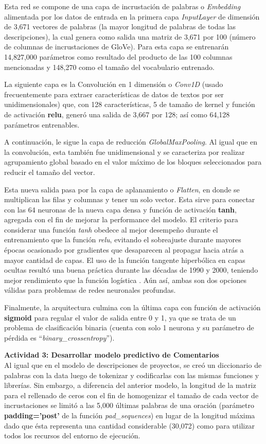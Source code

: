 Esta red se compone de una capa de incrustación de palabras o \textit{Embedding} alimentada por los datos de entrada en la primera capa \textit{InputLayer} de dimensión de 3,671 vectores de palabras (la mayor longitud de palabras de todas las descripciones), la cual genera como salida una matriz de 3,671 por 100 (número de columnas de incrustaciones de GloVe). Para esta capa se entrenarán 14,827,000 parámetros como resultado del producto de las 100 columnas mencionadas y 148,270 como el tamaño del vocabulario entrenado.

La siguiente capa es la Convolución en 1 dimensión o \textit{Conv1D} (usado frecuentemente para extraer características de datos de textos por ser unidimensionales) que, con 128 características, 5 de tamaño de kernel y función de activación \textbf{relu}, generó una salida de 3,667 por 128; así como 64,128 parámetros entrenables.

A continuación, le sigue la capa de reducción \textit{GlobalMaxPooling}. Al igual que en la convolución, esta también fue unidimensional y se caracteriza por realizar agrupamiento global basado en el valor máximo de los bloques seleccionados para reducir el tamaño del vector.

Esta nueva salida pasa por la capa de aplanamiento o \textit{Flatten}, en donde se multiplican las filas y columnas y tener un solo vector. Esta sirve para conectar con las 64 neuronas de la nueva capa densa y función de activación \textbf{tanh}, agregada con el fin de mejorar la performance del modelo. El criterio para considerar una función \textit{tanh} obedece al mejor desempeño durante el entrenamiento que la función \textit{relu}, evitando el sobreajuste durante mayores épocas ocasionado por gradientes que desaparecen al propagar hacia atrás a mayor cantidad de capas. El uso de la función tangente hiperbólica en capas ocultas resultó una buena práctica durante las décadas de 1990 y 2000, teniendo mejor rendimiento que la función logística \parencite{tec_brownlee2019vanishing_gradients}. Aún así, ambas son dos opciones válidas para problemas de redes neuronales profundas.

Finalmente, la arquitectura culmina con la última capa con función de activación \textbf{sigmoid} para regular el valor de salida entre 0 y 1, ya que se trata de un problema de clasificación binaria (cuenta con solo 1 neurona y su parámetro de pérdida es “\textit{binary\_crossentropy}”).

\textbf{Actividad 3: Desarrollar modelo predictivo de Comentarios}
\\
Al igual que en el modelo de descripciones de proyectos, se creó un diccionario de palabras con la data luego de tokenizar y codificarlas con las mismas funciones y librerías. Sin embargo, a diferencia del anterior modelo, la longitud de la matriz para el rellenado de ceros con el fin de homogenizar el tamaño de cada vector de incrustaciones se limitó a las 5,000 últimas palabras de una oración (parámetro \textbf{padding='post'} de la función \textit{pad\_sequences}) en lugar de la longitud máxima dado que ésta representa una cantidad considerable (30,072) como para utilizar todos los recursos del entorno de ejecución.

